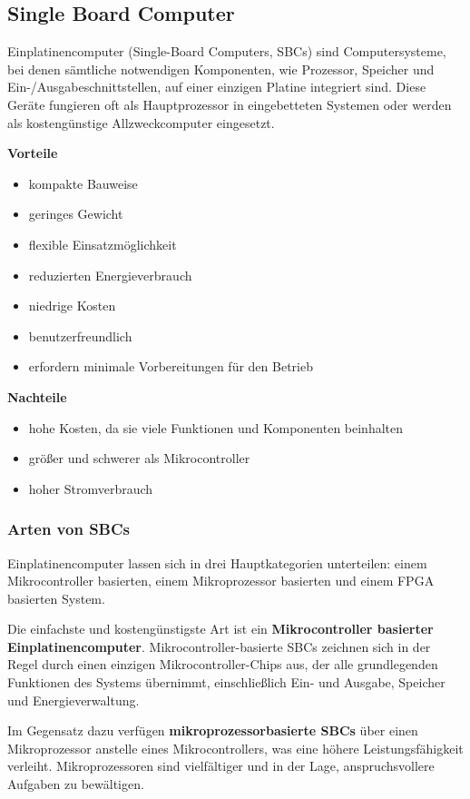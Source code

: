 \subsection{Single Board Computer}
Einplatinencomputer (Single-Board Computers, SBCs) sind Computersysteme, bei denen sämtliche notwendigen Komponenten, wie Prozessor, Speicher und Ein-/Ausgabeschnittstellen, auf einer einzigen Platine integriert sind. Diese Geräte fungieren oft als Hauptprozessor in eingebetteten Systemen oder werden als kostengünstige Allzweckcomputer eingesetzt.

\textbf{Vorteile}
\begin{itemize}
	\item kompakte Bauweise
	\item geringes Gewicht
	\item flexible Einsatzmöglichkeit
	\item reduzierten Energieverbrauch 
	\item niedrige Kosten
	\item benutzerfreundlich
	\item erfordern minimale Vorbereitungen für den Betrieb
\end{itemize}

\textbf{Nachteile}
\begin{itemize}
	\item hohe Kosten, da sie viele Funktionen und Komponenten beinhalten
	\item größer und schwerer als Mikrocontroller
	\item hoher Stromverbrauch
\end{itemize}

\subsubsection{Arten von SBCs}
Einplatinencomputer lassen sich in drei Hauptkategorien unterteilen: einem Mikrocontroller basierten, einem Mikroprozessor basierten und einem FPGA basierten System. 

Die einfachste und kostengünstigste Art ist ein \textbf{Mikrocontroller basierter Einplatinencomputer}. Mikrocontroller-basierte SBCs zeichnen sich in der Regel durch einen einzigen Mikrocontroller-Chips aus, der alle grundlegenden Funktionen des Systems übernimmt, einschließlich Ein- und Ausgabe, Speicher und Energieverwaltung. 

Im Gegensatz dazu verfügen \textbf{mikroprozessorbasierte SBCs} über einen Mikroprozessor anstelle eines Mikrocontrollers, was eine höhere Leistungsfähigkeit verleiht. Mikroprozessoren sind vielfältiger und in der Lage, anspruchsvollere Aufgaben zu bewältigen. 

